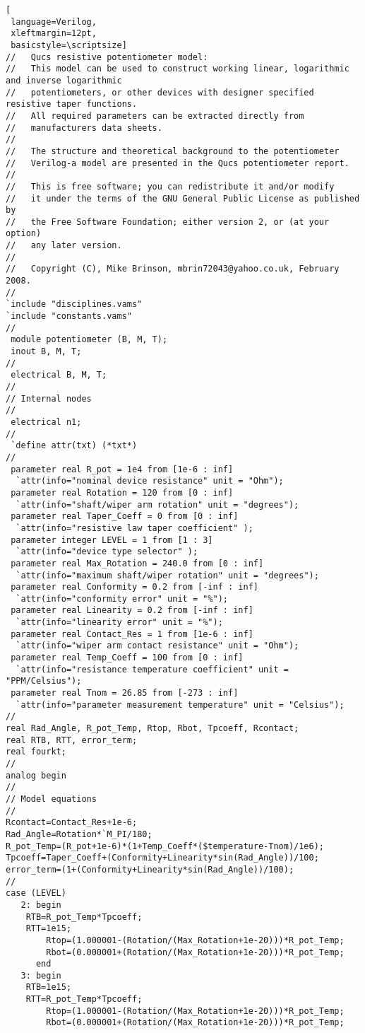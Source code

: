 
\begin{lstlisting}[
 language=Verilog, 
 xleftmargin=12pt,
 basicstyle=\scriptsize]
//   Qucs resistive potentiometer model:
//   This model can be used to construct working linear, logarithmic and inverse logarithmic
//   potentiometers, or other devices with designer specified resistive taper functions.
//   All required parameters can be extracted directly from
//   manufacturers data sheets.
//
//   The structure and theoretical background to the potentiometer
//   Verilog-a model are presented in the Qucs potentiometer report.
//
//   This is free software; you can redistribute it and/or modify
//   it under the terms of the GNU General Public License as published by
//   the Free Software Foundation; either version 2, or (at your option)
//   any later version.
// 
//   Copyright (C), Mike Brinson, mbrin72043@yahoo.co.uk, February 2008.
//
`include "disciplines.vams"
`include "constants.vams"
// 
 module potentiometer (B, M, T);
 inout B, M, T;
//
 electrical B, M, T;
//
// Internal nodes
//
 electrical n1;
//
 `define attr(txt) (*txt*)
//
 parameter real R_pot = 1e4 from [1e-6 : inf]
  `attr(info="nominal device resistance" unit = "Ohm");
 parameter real Rotation = 120 from [0 : inf]
  `attr(info="shaft/wiper arm rotation" unit = "degrees");
 parameter real Taper_Coeff = 0 from [0 : inf]
  `attr(info="resistive law taper coefficient" );
 parameter integer LEVEL = 1 from [1 : 3]
  `attr(info="device type selector" );
 parameter real Max_Rotation = 240.0 from [0 : inf]
  `attr(info="maximum shaft/wiper rotation" unit = "degrees");
 parameter real Conformity = 0.2 from [-inf : inf]
  `attr(info="conformity error" unit = "%");
 parameter real Linearity = 0.2 from [-inf : inf]
  `attr(info="linearity error" unit = "%");
 parameter real Contact_Res = 1 from [1e-6 : inf]
  `attr(info="wiper arm contact resistance" unit = "Ohm");
 parameter real Temp_Coeff = 100 from [0 : inf]
  `attr(info="resistance temperature coefficient" unit = "PPM/Celsius");
 parameter real Tnom = 26.85 from [-273 : inf]
  `attr(info="parameter measurement temperature" unit = "Celsius");
//
real Rad_Angle, R_pot_Temp, Rtop, Rbot, Tpcoeff, Rcontact;
real RTB, RTT, error_term;
real fourkt;
//
analog begin
//
// Model equations
//
Rcontact=Contact_Res+1e-6;
Rad_Angle=Rotation*`M_PI/180;
R_pot_Temp=(R_pot+1e-6)*(1+Temp_Coeff*($temperature-Tnom)/1e6);
Tpcoeff=Taper_Coeff+(Conformity+Linearity*sin(Rad_Angle))/100;
error_term=(1+(Conformity+Linearity*sin(Rad_Angle))/100);
//
case (LEVEL)
   2: begin
	RTB=R_pot_Temp*Tpcoeff;
	RTT=1e15;
        Rtop=(1.000001-(Rotation/(Max_Rotation+1e-20)))*R_pot_Temp;
        Rbot=(0.000001+(Rotation/(Max_Rotation+1e-20)))*R_pot_Temp;
      end
   3: begin
	RTB=1e15;
	RTT=R_pot_Temp*Tpcoeff;
        Rtop=(1.000001-(Rotation/(Max_Rotation+1e-20)))*R_pot_Temp;
        Rbot=(0.000001+(Rotation/(Max_Rotation+1e-20)))*R_pot_Temp;


\end{lstlisting}
